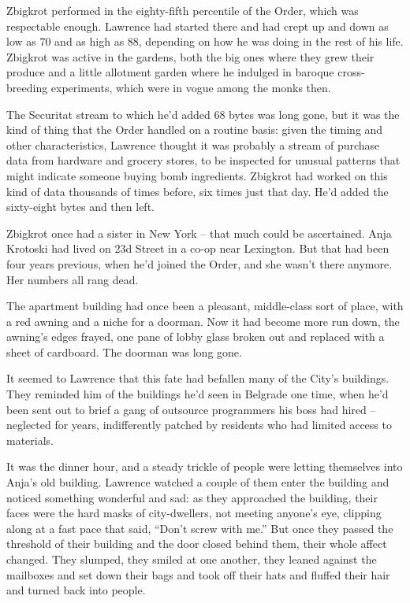 Zbigkrot performed in the eighty-fifth percentile of the Order, which 
was respectable enough. Lawrence had started there and had crept up and 
down as low as 70 and as high as 88, depending on how he was doing in 
the rest of his life. Zbigkrot was active in the gardens, both the big 
ones where they grew their produce and a little allotment garden where 
he indulged in baroque cross-breeding experiments, which were in vogue 
among the monks then.

The Securitat stream to which he'd added 68 bytes was long gone, but it 
was the kind of thing that the Order handled on a routine basis: given 
the timing and other characteristics, Lawrence thought it was probably 
a stream of purchase data from hardware and grocery stores, to be 
inspected for unusual patterns that might indicate someone buying bomb 
ingredients. Zbigkrot had worked on this kind of data thousands of 
times before, six times just that day. He'd added the sixty-eight bytes 
and then left.

Zbigkrot once had a sister in New York -- that much could be 
ascertained. Anja Krotoski had lived on 23d Street in a co-op near 
Lexington. But that had been four years previous, when he'd joined the 
Order, and she wasn't there anymore. Her numbers all rang dead.

The apartment building had once been a pleasant, middle-class sort of 
place, with a red awning and a niche for a doorman. Now it had become 
more run down, the awning's edges frayed, one pane of lobby glass 
broken out and replaced with a sheet of cardboard. The doorman was long 
gone.

It seemed to Lawrence that this fate had befallen many of the City's 
buildings. They reminded him of the buildings he'd seen in Belgrade one 
time, when he'd been sent out to brief a gang of outsource programmers 
his boss had hired -- neglected for years, indifferently patched by 
residents who had limited access to materials.

It was the dinner hour, and a steady trickle of people were letting 
themselves into Anja's old building. Lawrence watched a couple of them 
enter the building and noticed something wonderful and sad: as they 
approached the building, their faces were the hard masks of 
city-dwellers, not meeting anyone's eye, clipping along at a fast pace 
that said, “Don't screw with me.” But once they passed the 
threshold of their building and the door closed behind them, their 
whole affect changed. They slumped, they smiled at one another, they 
leaned against the mailboxes and set down their bags and took off their 
hats and fluffed their hair and turned back into people.

